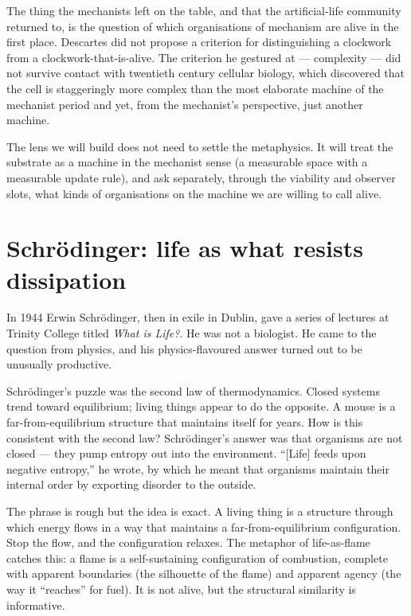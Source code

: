 The thing the mechanists left on the table, and that the artificial-life
community returned to, is the question of which organisations of mechanism
are alive in the first place. Descartes did not propose a criterion for
distinguishing a clockwork from a clockwork-that-is-alive. The criterion
he gestured at --- complexity --- did not survive contact with twentieth
century cellular biology, which discovered that the cell is staggeringly
more complex than the most elaborate machine of the mechanist period and
yet, from the mechanist's perspective, just another machine.

The lens we will build does not need to settle the metaphysics. It will
treat the substrate as a machine in the mechanist sense (a measurable
space with a measurable update rule), and ask separately, through the
viability and observer slots, what kinds of organisations on the machine
we are willing to call alive.

\section{Schr\"odinger: life as what resists dissipation}

In 1944 Erwin Schr\"odinger, then in exile in Dublin, gave a series of
lectures at Trinity College titled \textit{What is Life?}. He was not a
biologist. He came to the question from physics, and his physics-flavoured
answer turned out to be unusually productive.

Schr\"odinger's puzzle was the second law of thermodynamics. Closed systems
trend toward equilibrium; living things appear to do the opposite. A
mouse is a far-from-equilibrium structure that maintains itself for years.
How is this consistent with the second law? Schr\"odinger's answer was
that organisms are not closed --- they pump entropy out into the
environment. ``[Life] feeds upon negative entropy,'' he wrote, by which he
meant that organisms maintain their internal order by exporting disorder
to the outside.

The phrase is rough but the idea is exact. A living thing is a structure
through which energy flows in a way that maintains a far-from-equilibrium
configuration. Stop the flow, and the configuration relaxes. The metaphor
of life-as-flame catches this: a flame is a self-sustaining configuration
of combustion, complete with apparent boundaries (the silhouette of the
flame) and apparent agency (the way it ``reaches'' for fuel). It is not
alive, but the structural similarity is informative.

